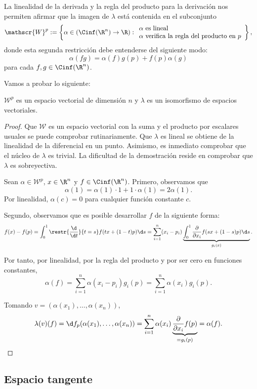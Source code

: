 La linealidad de la derivada y la regla del producto para la derivación nos
permiten afirmar que la imagen de $\lambda$ está contenida en el subconjunto
\[
  \mathscr{W}^{p} := \left\{ \alpha\in(\Cinf(\R^{n})\to\R) :
    \begin{array}{l}
      \alpha\text{ es lineal} \\
      \alpha\text{ verifica la regla del producto en $p$}
    \end{array}
\right\}
,\]
donde esta segunda restricción debe entenderse del siguiente modo:
\[
  \alpha(fg) = \alpha(f)g(p) + f(p)\alpha(g)
\]
para cada $f,g\in\Cinf(\R^{n})$.

Vamos a probar lo siguiente:
\begin{nth}
  $\mathscr{W}^{p}$ es un espacio vectorial de dimensión $n$ y $\lambda$ es un
  isomorfismo de espacios vectoriales.
\end{nth}
\begin{proof}
  Que $\mathscr{W}$ es un espacio vectorial con la suma y el producto por
  escalares usuales se puede comprobar rutinariamente. Que $\lambda$ es lineal
  se obtiene de la linealidad de la diferencial en un punto. Asimismo, es
  inmediato comprobar que el núcleo de $\lambda$ es trivial. La dificultad de la
  demostración reside en comprobar que $\lambda$ es sobreyectiva.

  Sean $\alpha\in \mathscr{W}^{p}$, $x\in \R^{n}$ y
  $f\in\Cinf(\R^{n})$. Primero, observamos que
  \[
    \alpha(1) = \alpha(1)\cdot 1 + 1\cdot\alpha(1) = 2\alpha(1)
  .\]
  Por linealidad, $\alpha(c) = 0$ para cualquier función constante $c$.

  Segundo, observamos que es posible desarrollar $f$ de la siguiente forma:
  \[
    f(x)-f(p) = \int_{0}^{1} \restr{\frac{\d}{\d t}}{t = s}f(tx+(1-t)p)\d s =
    \sum_{i=1}^{n}(x_{i}-p_{i})\underbrace{\int_{0}^{1}\frac{\partial}{\partial
        x_{i}}f(sx + (1-s)p)\d s}_{g_{i}(x)}
  .\]

Por tanto, por linealidad, por la regla del producto y por ser cero en funciones
constantes,
\[
  \alpha(f) = \sum_{i=1}^{n} \alpha(x_{i}-p_{i})g_{i}(p) = \sum_{i=1}^{n} \alpha(x_{i})g_{i}(p)
.\]

Tomando $v = (\alpha(x_{1}), \dots, \alpha(x_{n}))$,
\[
  \lambda(v)(f) = \d f_{p}(\alpha(x_{1}),\dots,\alpha(x_{n})) = \sum_{i=1}^{n}
  \alpha(x_{i})\underbrace{\frac{\partial}{\partial x_{i}}f(p)}_{=g_{i}(p)} = \alpha(f)
.\]
\end{proof}

\subsection{Espacio tangente}

